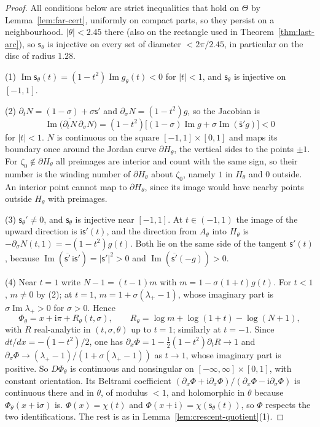 \documentclass[11pt]{amsart}
\theoremstyle{definition}
\newcommand{\ii}{\mathrm{i}}
\begin{document}
\begin{proof}
All conditions below are strict inequalities that hold on $\Theta$ by
Lemma~\ref{lem:far-cert}, uniformly on compact parts, so they persist on a
neighbourhood.  $|\theta|<2.45$ there (also on the rectangle used in
Theorem~\ref{thm:last-arc}), so $\mathsf s_\theta$ is injective on every set of diameter
$<2\pi/2.45$, in particular on the disc of radius $1.28$.

(1) $\operatorname{Im}\mathsf s_\theta(t)=(1-t^2)\operatorname{Im}g_\theta(t)<0$ for $|t|<1$, and $\mathsf s_\theta$ is injective on $[-1,1]$.

(2) $\partial_tN=(1-\sigma)+\sigma \mathsf s'$ and $\partial_\sigma N=(1-t^2)g$, so the Jacobian is
\[
 \operatorname{Im}\bigl(\overline{\partial_tN}\,\partial_\sigma N\bigr)
 =(1-t^2)\bigl[(1-\sigma)\operatorname{Im}g+\sigma\operatorname{Im}(\bar{\mathsf s}'g)\bigr]<0
\]
for $|t|<1$.  $N$ is continuous on the square $[-1,1]\times[0,1]$ and maps its boundary
once around the Jordan curve $\partial H_\theta$, the vertical sides to the points $\pm1$.
For $\zeta_0\notin\partial H_\theta$ all preimages are interior and count with the same sign, so
their number is the winding number of $\partial H_\theta$ about $\zeta_0$, namely $1$ in
$H_\theta$ and $0$ outside.  An interior point cannot map to $\partial H_\theta$, since its image
would have nearby points outside $H_\theta$ with preimages.

(3) $\mathsf s_\theta'\ne0$, and $\mathsf s_\theta$ is injective near $[-1,1]$.  At $t\in(-1,1)$ the image of
the upward direction is $\ii \mathsf s'(t)$, and the direction from $A_\theta$ into $H_\theta$ is
$-\partial_\sigma N(t,1)=-(1-t^2)g(t)$.  Both lie on the same side of the tangent
$\mathsf s'(t)$, because $\operatorname{Im}(\overline{\mathsf s'}\,\ii \mathsf s')=|\mathsf s'|^2>0$ and $\operatorname{Im}(\overline{\mathsf s'}(-g))>0$.

(4) Near $t=1$ write $N-1=(t-1)m$ with $m=1-\sigma(1+t)g(t)$.  For $t<1$, $m\ne0$ by (2);
at $t=1$, $m=1+\sigma(\lambda_+-1)$, whose imaginary part is $\sigma\operatorname{Im}\lambda_+>0$ for $\sigma>0$.  Hence
\[
 \Phi_\theta=x+\ii\pi+R_\theta(t,\sigma),\qquad R_\theta=\log m+\log(1+t)-\log(N+1),
\]
with $R$ real-analytic in $(t,\sigma,\theta)$ up to $t=1$; similarly at $t=-1$.  Since
$dt/dx=-(1-t^2)/2$, one has $\partial_x\Phi=1-\tfrac12(1-t^2)\partial_tR\to1$ and
$\partial_\sigma\Phi\to(\lambda_+-1)/(1+\sigma(\lambda_+-1))$ as $t\to1$, whose imaginary part is positive.  So
$D\Phi_\theta$ is continuous and nonsingular on $[-\infty,\infty]\times[0,1]$, with constant
orientation.  Its Beltrami coefficient
$(\partial_x\Phi+\ii\partial_\sigma\Phi)/(\partial_x\Phi-\ii\partial_\sigma\Phi)$ is continuous there and in $\theta$, of modulus
$<1$, and holomorphic in $\theta$ because $\Phi_\theta(x+\ii\sigma)$ is.  $\Phi(x)=\chi(t)$ and
$\Phi(x+\ii)=\chi(\mathsf s_\theta(t))$, so $\Phi$ respects the two identifications.  The rest is as in
Lemma~\ref{lem:crescent-quotient}(1).
\end{proof}
\end{document}
